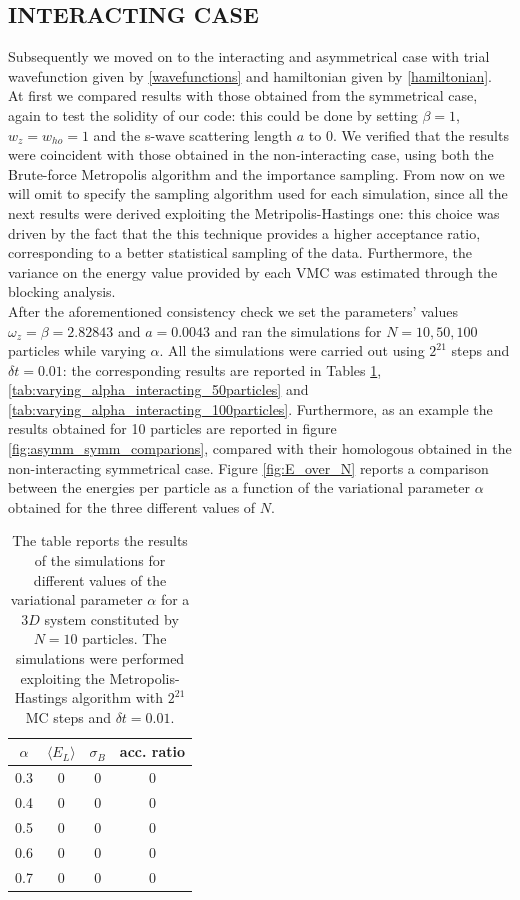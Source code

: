 \subsection{INTERACTING CASE}
Subsequently we moved on to the interacting and asymmetrical case with trial wavefunction given by \ref{wavefunctions} and hamiltonian given by \ref{hamiltonian}. At first we compared results with those obtained from the symmetrical case, again to test the solidity of our code: this could be done by setting $\beta=1$, $w_z = w_{ho} = 1$ and the s-wave scattering length $a$ to 0. We verified that the results were coincident with those obtained in the non-interacting case, using both the Brute-force Metropolis algorithm and the importance sampling. From now on we will omit to specify the sampling algorithm used for each simulation, since all the next results were derived exploiting the Metripolis-Hastings one: this choice was driven by the fact that the this technique provides a higher acceptance ratio, corresponding to a better statistical sampling of the data. Furthermore, the variance on the energy value provided by each VMC was estimated through the blocking analysis. \\

After the aforementioned consistency check we set the parameters' values $\omega_z = \beta = 2.82843$ and $a = 0.0043$ and ran the simulations for $N=10,50,100$ particles while varying $\alpha$. All the simulations were carried out using $2^{21}$ steps and $\delta t = 0.01$: the corresponding results are reported in Tables \ref{tab:varying_alpha_interacting_10particles}, \ref{tab:varying_alpha_interacting_50particles} and \ref{tab:varying_alpha_interacting_100particles}. Furthermore, as an example the results obtained for 10 particles are reported in figure \ref{fig:asymm_symm_comparions}, compared with their homologous obtained in the non-interacting symmetrical case. Figure \ref{fig:E_over_N} reports a comparison between the energies per particle as a function of the variational parameter $\alpha$ obtained for the three different values of $N$. \\


\begin{table}[H]
    \centering
    \begin{tabular}{cccc}
        $\alpha$ & $\langle E_L \rangle$ & $\sigma_B$ & acc. ratio \\
        \midrule
        0.3 & 0 & 0 & 0 \\
        0.4 & 0 & 0 & 0 \\
        0.5 & 0 & 0 & 0 \\
        0.6 & 0 & 0 & 0 \\
        0.7 & 0 & 0 & 0 \\
    \end{tabular}
    \caption{The table reports the results of the simulations for different values of the variational parameter $\alpha$ for a $3D$ system constituted by $N=10$ particles. The simulations were performed exploiting the Metropolis-Hastings algorithm with $2^{21}$ MC steps and $\delta t=0.01$.  }
    \label{tab:varying_alpha_interacting_10particles}
\end{table}

